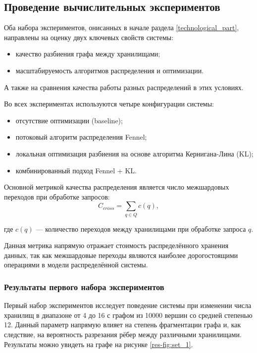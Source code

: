 \subsection{Проведение вычислительных экспериментов}

Оба набора экспериментов, онисанных в начале раздела \ref{technological_part}, направлены на оценку двух ключевых свойств системы:
\begin{itemize}
    \item качество разбиения графа между хранилищами;
    \item масштабируемость алгоритмов распределения и оптимизации.
\end{itemize}

А также на сравнения качества работы разных распределений в этих условиях.

Во всех экспериментах используются четыре конфигурации системы:
\begin{itemize}
    \item отсутствие оптимизации (baseline);
    \item потоковый алгоритм распределения Fennel;
    \item локальная оптимизация разбиения на основе алгоритма Кернигана-Лина (KL);
    \item комбинированный подход Fennel + KL.
\end{itemize}

Основной метрикой качества распределения является число межшардовых переходов при обработке запросов:
\begin{equation*}
C_{cross} = \sum_{q \in Q} c(q),
\end{equation*}

где $c(q)$ --- количество переходов между хранилищами при обработке запроса $q$.

Данная метрика напрямую отражает стоимость распределённого хранения данных, так как межшардовые переходы являются наиболее дорогостоящими операциями в модели распределённой системы.

\subsubsection{Результаты первого набора экспериментов}

Первый набор экспериментов исследует поведение системы при изменении числа хранилищ в диапазоне от 4 до 16 с графом из 10000 вершин со средней степенью 12. Данный параметр напрямую влияет на степень фрагментации графа и, как следствие, на вероятность разрезания рёбер между различными хранилищами. Результаты можно увидеть на графе на рисунке \ref{res-fig:set_1}.

